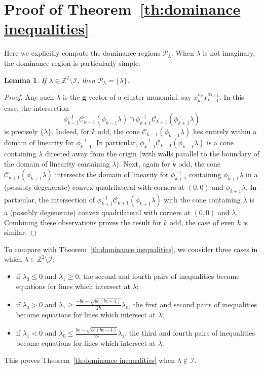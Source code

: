 \documentclass{amsart}
\newtheorem{lemma}[theorem]{Lemma}
\numberwithin{theorem}{section}
\newcommand{\bfg}{\boldsymbol{g}}
\newcommand{\cC}{\mathcal{C}}
\newcommand{\cI}{\mathcal{I}}
\newcommand{\cP}{\mathcal{P}}
\newcommand{\ZZ}{\mathbb{Z}}
\begin{document}
\section{Proof of Theorem~\ref{th:dominance inequalities}}
\label{sec:dominance inequalities}

  Here we explicitly compute the dominance regions $\cP_\lambda$.
  When $\lambda$ is not imaginary, the dominance region is particularly simple.
  \begin{lemma}
    \label{le:cluster monomials}
    If $\lambda\in\ZZ^2\setminus\cI$, then $\cP_\lambda=\{\lambda\}$.
  \end{lemma}
  \begin{proof}
    Any such $\lambda$ is the $\bfg$-vector of a cluster monomial, say $x_k^{\alpha_k}x_{k+1}^{\alpha_{k+1}}$.
    In this case, the intersection
    \[\phi_{k-1}^{-1}\cC_{k-1}(\phi_{k-1}\lambda) \cap \phi_{k+1}^{-1}\cC_{k+1}(\phi_{k+1}\lambda)\]
    is precisely $\{\lambda\}$. 
    Indeed, for $k$ odd, the cone $\cC_{k-1}(\phi_{k-1}\lambda)$ lies entirely within a domain of linearity for $\phi_{k-1}^{-1}$.
    In particular, $\phi_{k-1}^{-1}\cC_{k-1}(\phi_{k-1}\lambda)$ is a cone containing $\lambda$ directed away from the origin (with walls parallel to the boundary of the domain of linearity containing $\lambda$).
    Next, again for $k$ odd, the cone $\cC_{k+1}(\phi_{k+1}\lambda)$ intersects the domain of linearity for $\phi_{k+1}^{-1}$ containing $\phi_{k+1}\lambda$ in a (possibly degenerate) convex quadrilateral with corners at $(0,0)$ and $\phi_{k+1}\lambda$.
    In particular, the intersection of $\phi_{k+1}^{-1}\cC_{k+1}(\phi_{k+1}\lambda)$ with the cone containing $\lambda$ is a (possibly degenerate) convex quadrilateral with corners at $(0,0)$ and $\lambda$.
    Combining these observations proves the result for $k$ odd, the case of even $k$ is similar.
  \end{proof}
  To compare with Theorem~\ref{th:dominance inequalities}, we consider three cases in which $\lambda\in\ZZ^2\setminus\cI$:
  \begin{itemize}
    \item if $\lambda_0 \le 0$ and $\lambda_1 \ge 0$, the second and fourth pairs of inequalities become equations for lines which intersect at $\lambda$;
    \item if $\lambda_0 > 0$ and $\lambda_1 \ge \frac{-bc+\sqrt{bc(bc-4)}}{2b}\lambda_0$, the first and second pairs of inequalities become equations for lines which intersect at $\lambda$;
    \item if $\lambda_1 < 0$ and $\lambda_0 \le \frac{bc-\sqrt{bc(bc-4)}}{2c}\lambda_1$, the third and fourth pairs of inequalities become equations for lines which intersect at $\lambda$.
  \end{itemize}
  This proves Theorem~\ref{th:dominance inequalities} when $\lambda\notin\cI$.
\end{document}

